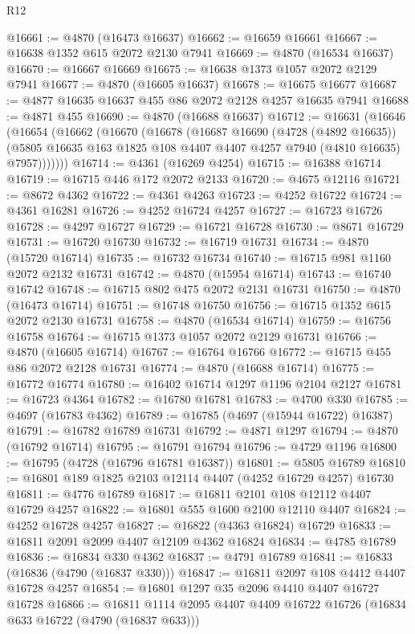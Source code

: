 \begin{lexlean}{R12}
\begin{coremodule}
@16661 := @4870 (@16473 @16637)
@16662 := @16659 @16661
@16667 := @16638 @1352 @615 @2072 @2130 @7941
@16669 := @4870 (@16534 @16637)
@16670 := @16667 @16669
@16675 := @16638 @1373 @1057 @2072 @2129 @7941
@16677 := @4870 (@16605 @16637)
@16678 := @16675 @16677
@16687 := @4877 @16635 @16637 @455 @86 @2072 @2128 @4257 @16635 @7941
@16688 := @4871 @455
@16690 := @4870 (@16688 @16637)
@16712 := @16631
    (@16646
      (@16654
        (@16662
          (@16670
            (@16678
              (@16687
                @16690
                (@4728 (@4892 @16635))
                (@5805 @16635 @163 @1825 @108 @4407 @4407 @4257 @7940 (@4810 @16635) @7957)))))))
@16714 := @4361 (@16269 @4254)
@16715 := @16388 @16714
@16719 := @16715 @446 @172 @2072 @2133
@16720 := @4675 @12116
@16721 := @8672 @4362
@16722 := @4361 @4263
@16723 := @4252 @16722
@16724 := @4361 @16281
@16726 := @4252 @16724 @4257
@16727 := @16723 @16726
@16728 := @4297 @16727
@16729 := @16721 @16728
@16730 := @8671 @16729
@16731 := @16720 @16730
@16732 := @16719 @16731
@16734 := @4870 (@15720 @16714)
@16735 := @16732 @16734
@16740 := @16715 @981 @1160 @2072 @2132 @16731
@16742 := @4870 (@15954 @16714)
@16743 := @16740 @16742
@16748 := @16715 @802 @475 @2072 @2131 @16731
@16750 := @4870 (@16473 @16714)
@16751 := @16748 @16750
@16756 := @16715 @1352 @615 @2072 @2130 @16731
@16758 := @4870 (@16534 @16714)
@16759 := @16756 @16758
@16764 := @16715 @1373 @1057 @2072 @2129 @16731
@16766 := @4870 (@16605 @16714)
@16767 := @16764 @16766
@16772 := @16715 @455 @86 @2072 @2128 @16731
@16774 := @4870 (@16688 @16714)
@16775 := @16772 @16774
@16780 := @16402 @16714 @1297 @1196 @2104 @2127
@16781 := @16723 @4364
@16782 := @16780 @16781
@16783 := @4700 @330
@16785 := @4697 (@16783 @4362)
@16789 := @16785 (@4697 (@15944 @16722) @16387)
@16791 := @16782 @16789 @16731
@16792 := @4871 @1297
@16794 := @4870 (@16792 @16714)
@16795 := @16791 @16794
@16796 := @4729 @1196
@16800 := @16795 (@4728 (@16796 @16781 @16387))
@16801 := @5805 @16789
@16810 := @16801 @189 @1825 @2103 @12114 @4407 (@4252 @16729 @4257) @16730
@16811 := @4776 @16789
@16817 := @16811 @2101 @108 @12112 @4407 @16729 @4257
@16822 := @16801 @555 @1600 @2100 @12110 @4407
@16824 := @4252 @16728 @4257
@16827 := @16822 (@4363 @16824) @16729
@16833 := @16811 @2091 @2099 @4407 @12109 @4362 @16824
@16834 := @4785 @16789
@16836 := @16834 @330 @4362
@16837 := @4791 @16789
@16841 := @16833 (@16836 (@4790 (@16837 @330)))
@16847 := @16811 @2097 @108 @4412 @4407 @16728 @4257
@16854 := @16801 @1297 @35 @2096 @4410 @4407 @16727 @16728
@16866 := @16811 @1114 @2095 @4407 @4409 @16722 @16726 (@16834 @633 @16722 (@4790 (@16837 @633)))

\end{coremodule}
\end{lexlean}

